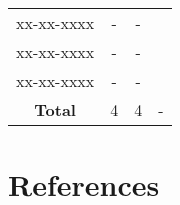 \documentclass[12pt, a4paper]{report}
\begin{document}
\begin{table}[H]
\begin{tabular}{cccc}
            xx-xx-xxxx      & -                         & -                             &                                               \\
            xx-xx-xxxx      & -                         & -                             &                                               \\
            xx-xx-xxxx      & -                         & -                             &                                               \\ \hline
            \textbf{Total}  & 4                         & 4                            & -                                             \\  
        \end{tabular}
    \end{table}

\newpage 

\chapter{References}
\end{document}
